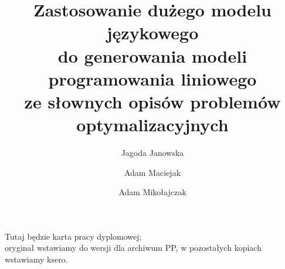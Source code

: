\documentclass[polish,bachelor,a4paper,oneside]{ppfcmthesis}
\author{%
   Jagoda Janowska \album{151798} \and 
   Adam Maciejak \album{151756} \and
   Adam Mikołajczak \album{151247}}
\title{Zastosowanie dużego modelu językowego \\do generowania modeli programowania liniowego \\ze słownych opisów problemów optymalizacyjnych}
\begin{document}
\frontmatter\pagestyle{empty}%
\maketitle\cleardoublepage%


\thispagestyle{empty}\vspace*{\fill}%
\begin{center}Tutaj będzie karta pracy dyplomowej;\\oryginał wstawiamy do wersji dla archiwum PP, w pozostałych kopiach wstawiamy ksero.\end{center}%
\vfill\cleardoublepage%


\pagestyle{ppfcmthesis}%
\tableofcontents* 
\cleardoublepage %


\mainmatter%









{\raggedright\sloppy\small}


\cleardoublepage\appendix%
\newpage



\ppcolophon
\end{document}
